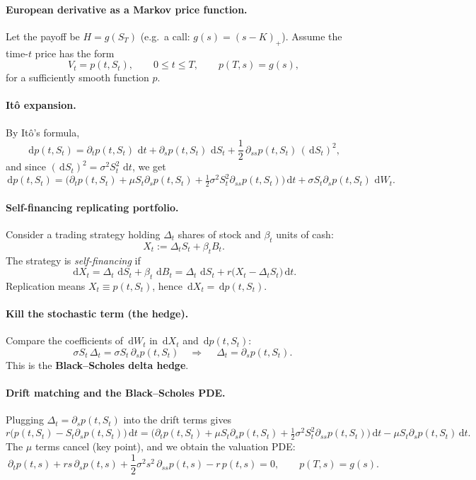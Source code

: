 \documentclass[11pt]{article}
\newcommand{\dd}{\,\mathrm{d}}
\newcommand{\1}{\mathbf{1}}
\begin{document}
\paragraph{European derivative as a Markov price function.}
Let the payoff be $H=g(S_T)$ (e.g.\ a call: $g(s)=(s-K)_+$).
Assume the time-$t$ price has the form
\[
V_t = p(t,S_t),
\qquad 0\le t\le T,
\qquad p(T,s)=g(s),
\]
for a sufficiently smooth function $p$.

\paragraph{It\^o expansion.}
By It\^o's formula,
\[
\dd p(t,S_t)
=
\partial_t p(t,S_t)\,\dd t
+\partial_s p(t,S_t)\,\dd S_t
+\frac12\,\partial_{ss}p(t,S_t)\,(\dd S_t)^2,
\]
and since $(\dd S_t)^2=\sigma^2 S_t^2\,\dd t$, we get
\[
\dd p(t,S_t)
=
\Big(\partial_t p(t,S_t)+\mu S_t\partial_s p(t,S_t)
+\tfrac12\sigma^2 S_t^2\partial_{ss}p(t,S_t)\Big)\dd t
+\sigma S_t\partial_s p(t,S_t)\,\dd W_t.
\]

\paragraph{Self-financing replicating portfolio.}
Consider a trading strategy holding $\Delta_t$ shares of stock and $\beta_t$ units of cash:
\[
X_t:=\Delta_t S_t+\beta_t B_t.
\]
The strategy is \emph{self-financing} if
\[
\dd X_t=\Delta_t\,\dd S_t+\beta_t\,\dd B_t
=\Delta_t\,\dd S_t+r\big(X_t-\Delta_t S_t\big)\dd t.
\]
Replication means $X_t\equiv p(t,S_t)$, hence $\dd X_t=\dd p(t,S_t)$.

\paragraph{Kill the stochastic term (the hedge).}
Compare the coefficients of $\dd W_t$ in $\dd X_t$ and $\dd p(t,S_t)$:
\[
\sigma S_t\,\Delta_t
=
\sigma S_t\,\partial_s p(t,S_t)
\quad\Longrightarrow\quad
\boxed{\ \Delta_t=\partial_s p(t,S_t).\ }
\]
This is the \textbf{Black--Scholes delta hedge}.

\paragraph{Drift matching and the Black--Scholes PDE.}
Plugging $\Delta_t=\partial_s p(t,S_t)$ into the drift terms gives
\[
r\big(p(t,S_t)-S_t\partial_s p(t,S_t)\big)\dd t
=
\Big(\partial_t p(t,S_t)+\mu S_t\partial_s p(t,S_t)
+\tfrac12\sigma^2 S_t^2\partial_{ss}p(t,S_t)\Big)\dd t
-\mu S_t\partial_s p(t,S_t)\dd t.
\]
The $\mu$ terms cancel (key point), and we obtain the valuation PDE:
\[
\boxed{\ \partial_t p(t,s)+rs\,\partial_s p(t,s)
+\frac12\sigma^2 s^2\,\partial_{ss}p(t,s)-r\,p(t,s)=0,
\qquad p(T,s)=g(s).\ }
\]
\end{document}
